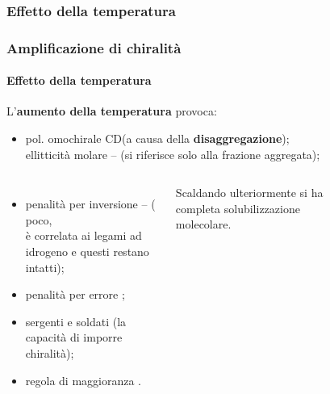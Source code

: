 \subsubsection{Effetto della temperatura}\begin{frame}\frametitle{Amplificazione di chiralità}\framesubtitle{Effetto della temperatura}
L'\textbf{aumento della temperatura} provoca: \cite{tesi}
\begin{itemize}
 \item pol. omochirale CD\textdownarrow (a causa della \textbf{disaggregazione});\\ ellitticità molare -- (si riferisce solo alla frazione aggregata);
\end{itemize}
\begin{columns}
\begin{itemize}
 \item penalità per inversione -- ( \textdownarrow poco,\\ è correlata ai legami ad idrogeno e questi restano intatti);
 \item penalità per errore \textdownarrow ;
 \item sergenti e soldati \textdownarrow (\textdownarrow la capacità di imporre chiralità);
 \item regola di maggioranza \textuparrow .
\end{itemize}

Scaldando ulteriormente si ha completa solubilizzazione molecolare.
\begin{figure}{}\end{figure}\end{columns}
\end{frame}


